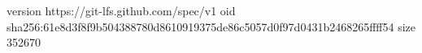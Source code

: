 version https://git-lfs.github.com/spec/v1
oid sha256:61e8d3f8f9b504388780d8610919375de86c5057d0f97d0431b2468265ffff54
size 352670
